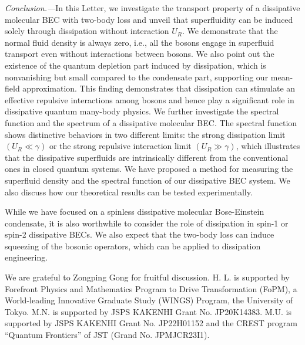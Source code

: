 \documentclass[aps,prl,twocolumn,superscriptaddress,]{revtex4-1}
\begin{document}



\emph{Conclusion.---}In this Letter, we investigate the
transport property of a dissipative molecular BEC with two-body loss and
unveil that superfluidity can be induced solely through dissipation
without interaction $U_{R}$. 
We demonstrate that the normal fluid density is always zero, i.e., all the bosons engage in superfluid transport even without interactions between bosons. We also point out the existence of the quantum depletion part induced by dissipation, which is nonvanishing but small compared to the condensate part, supporting our mean-field approximation. This finding demonstrates that dissipation can stimulate an effective repulsive interactions among
bosons and hence play a significant role in dissipative
quantum many-body physics. We further investigate the spectral function
and the spectrum of a dissipative molecular BEC. The spectral function shows distinctive
behaviors in two different limits: the strong dissipation limit $(U_{R}\ll\gamma)$
or the strong repulsive interaction limit $(U_{R}\gg\gamma)$, which illustrates
that the dissipative superfluids are intrinsically different from the
conventional ones in closed quantum systems. We have proposed
a method for measuring the superfluid density and the spectral function
of our dissipative BEC system. We also discuss how our theoretical results can be tested experimentally.

While we have focused on a spinless dissipative molecular Bose-Einstein condensate, it is also worthwhile to consider the role of dissipation in spin-1 or spin-2 dissipative BECs. We also expect that the two-body loss can induce squeezing of the bosonic operators, which can be applied to dissipation engineering.

We are grateful to Zongping Gong for fruitful discussion. H. L. is
supported by Forefront Physics and Mathematics Program to Drive Transformation
(FoPM), a World-leading Innovative Graduate Study (WINGS) Program,
the University of Tokyo. M.N. is supported by JSPS KAKENHI Grant No.
JP20K14383. M.U. is supported by JSPS KAKENHI Grant No. JP22H01152
and the CREST program “Quantum Frontiers” of JST (Grand No. JPMJCR23I1).



\end{document}
